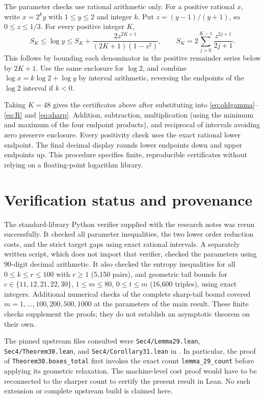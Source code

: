\documentclass[11pt,a4paper]{article}
\theoremstyle{remark}
\begin{document}
The parameter checks use rational arithmetic only. For a positive rational
$x$, write $x=2^ky$ with $1\leq y\leq2$ and integer $k$. Put
$z=(y-1)/(y+1)$, so $0\leq z\leq1/3$. For every positive integer $K$,
\begin{equation}\label{eq:logcert}
 S_K\leq\log y\leq S_K+
 \frac{2z^{2K+1}}{(2K+1)(1-z^2)},\qquad
 S_K=2\sum_{j=0}^{K-1}\frac{z^{2j+1}}{2j+1}.
\end{equation}
This follows by bounding each denominator in the positive remainder series
below by $2K+1$. Use the same enclosure for $\log2$, and combine
$\log x=k\log2+\log y$ by interval arithmetic, reversing the endpoints
of the $\log2$ interval if $k<0$.

Taking $K=48$ gives the certificates above after substituting into
\eqref{eq:oldgamma}--\eqref{eq:R} and \eqref{eq:sharp}. Addition,
subtraction, multiplication (using the minimum and maximum of the four
endpoint products), and reciprocal of intervals avoiding zero preserve
enclosure. Every positivity check uses the exact rational lower endpoint.
The final decimal display rounds lower endpoints down and upper endpoints
up. This procedure specifies finite, reproducible certificates without
relying on a floating-point logarithm library.

\section{Verification status and provenance}

The standard-library Python verifier supplied with the research notes was
rerun successfully. It checked all parameter inequalities, the two lower
order reduction costs, and the strict target gaps using exact rational
intervals. A separately written script, which does not import that verifier,
checked the parameters using 90-digit decimal arithmetic. It also checked
the entropy inequalities for all $0\leq k\leq r\leq100$ with $r\geq1$
(5,150 pairs), and geometric tail bounds for
$c\in\{11,12,21,22,30\}$, $1\leq m\leq80$, $0\leq t\leq m$
(16,600 triples), using exact integers. Additional numerical checks of the
complete sharp-tail bound covered $m=1,\ldots,100,200,500,1000$ at the
parameters of the main result. These finite checks supplement the proofs;
they do not establish an asymptotic theorem on their own.

The pinned upstream files consulted were
\texttt{Sec4/Lemma29.lean}, \texttt{Sec4/Theorem30.lean}, and
\texttt{Sec4/Corollary31.lean} in \cite{formal}. In particular, the proof of
\texttt{Theorem30.boxes\_total} first invokes the exact count
\texttt{lemma\_29\_count} before applying its geometric relaxation. The
machine-level cost proof would have to be reconnected to the sharper count
to certify the present result in Lean. No such extension or complete
upstream build is claimed here.
\end{document}
